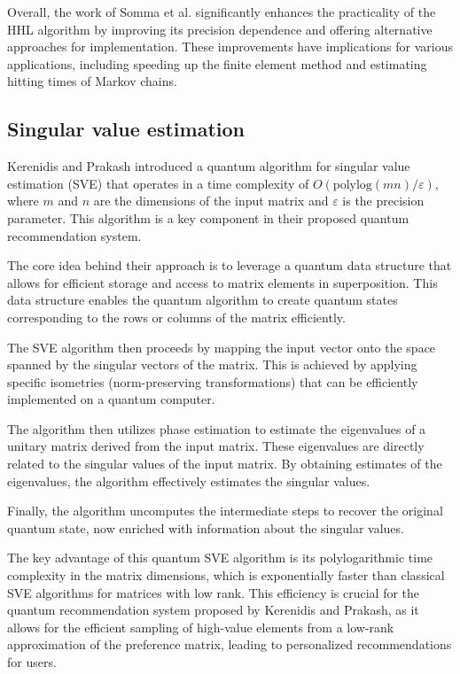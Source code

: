 \documentclass[12pt]{extarticle}
\begin{document}
Overall, the work of Somma et al. significantly enhances the practicality of the HHL algorithm by improving its precision dependence and offering alternative approaches for implementation.
These improvements have implications for various applications, including speeding up the finite element method and estimating hitting times of Markov chains.

\subsection{Singular value estimation}


Kerenidis and Prakash\cite{kerenidis2016quantum} introduced a quantum algorithm for singular value estimation (SVE) that operates in a time complexity of $O(\text{polylog}(mn)/\varepsilon)$,
where $m$ and $n$ are the dimensions of the input matrix and $\varepsilon$ is the precision parameter.
This algorithm is a key component in their proposed quantum recommendation system.

The core idea behind their approach is to leverage a quantum data structure that allows for efficient storage and access to matrix elements in superposition.
This data structure enables the quantum algorithm to create quantum states corresponding to the rows or columns of the matrix efficiently.

The SVE algorithm then proceeds by mapping the input vector onto the space spanned by the singular vectors of the matrix.
This is achieved by applying specific isometries (norm-preserving transformations) that can be efficiently implemented on a quantum computer.

The algorithm then utilizes phase estimation to estimate the eigenvalues of a unitary matrix derived from the input matrix.
These eigenvalues are directly related to the singular values of the input matrix.
By obtaining estimates of the eigenvalues, the algorithm effectively estimates the singular values.

Finally, the algorithm uncomputes the intermediate steps to recover the original quantum state, now enriched with information about the singular values.

The key advantage of this quantum SVE algorithm is its polylogarithmic time complexity in the matrix dimensions,
which is exponentially faster than classical SVE algorithms for matrices with low rank.
This efficiency is crucial for the quantum recommendation system proposed by Kerenidis and Prakash,
as it allows for the efficient sampling of high-value elements from a low-rank approximation of the preference matrix,
leading to personalized recommendations for users.
\end{document}
